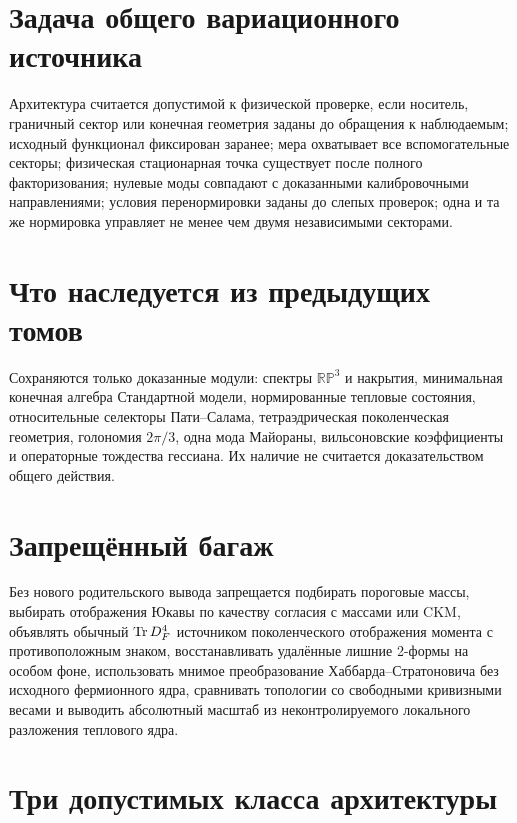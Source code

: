 \section{Задача общего вариационного источника}

\begin{definition}
Архитектура считается допустимой к физической проверке, если носитель,
граничный сектор или конечная геометрия заданы до обращения к наблюдаемым;
исходный функционал фиксирован заранее; мера охватывает все вспомогательные
секторы; физическая стационарная точка существует после полного
факторизования; нулевые моды совпадают с доказанными калибровочными
направлениями; условия перенормировки заданы до слепых проверок; одна и та же
нормировка управляет не менее чем двумя независимыми секторами.
\end{definition}

\section{Что наследуется из предыдущих томов}

Сохраняются только доказанные модули: спектры \(\mathbb{RP}^3\) и накрытия,
минимальная конечная алгебра Стандартной модели, нормированные тепловые
состояния, относительные селекторы Пати--Салама, тетраэдрическая
поколенческая геометрия, голономия \(2\pi/3\), одна мода Майораны,
вильсоновские коэффициенты и операторные тождества гессиана. Их наличие не
считается доказательством общего действия.

\section{Запрещённый багаж}

\begin{nogocriterion}
Без нового родительского вывода запрещается подбирать пороговые массы,
выбирать отображения Юкавы по качеству согласия с массами или CKM,
объявлять обычный \(\operatorname{Tr} D_F^4\) источником поколенческого отображения
момента с противоположным знаком, восстанавливать удалённые лишние 2-формы
на особом фоне, использовать мнимое преобразование Хаббарда--Стратоновича
без исходного фермионного ядра, сравнивать топологии со свободными
кривизными весами и выводить абсолютный масштаб из неконтролируемого
локального разложения теплового ядра.
\end{nogocriterion}

\section{Три допустимых класса архитектуры}

